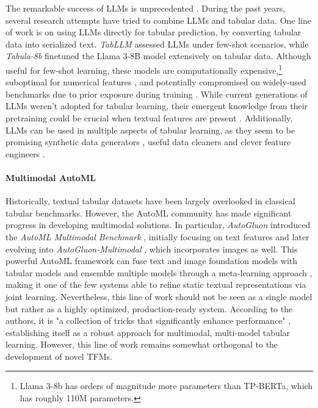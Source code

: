 \documentclass{article}
\begin{document}
The remarkable success of LLMs is unprecedented \cite{brown_language_2020, openai_gpt-4_2024}. During the past years, several research attempts have tried to combine LLMs and tabular data. One line of work is on using LLMs directly for tabular prediction, by converting tabular data into serialized text. \textit{TabLLM} \cite{hegselmann_tabllm_2023} assessed LLMs under few-shot scenarios, while \textit{Tabula-8b} \cite{gardner_large_2024} finetuned the Llama 3-8B model extensively on tabular data. Although useful for few-shot learning, these models are computationally expensive,\footnote{Llama 3-8b has orders of magnitude more parameters than TP-BERTa, which has roughly 110M parameters.} suboptimal for numerical features \cite{thawani_representing_2021, van_breugel_position_2024}, and potentially compromised on widely-used benchmarks due to prior exposure during training \cite{bordt_elephants_2024}. While current generations of LLMs weren't adopted for tabular learning, their emergent knowledge from their pretraining could be crucial when textual features are present \cite{van_breugel_position_2024, fang_large_2024}. Additionally, LLMs can be used in multiple aspects of tabular learning, as they seem to be promising synthetic data generators \cite{borisov_language_2022, solatorio_realtabformer_2023}, useful data cleaners \cite{bendinelli_exploring_2025} and clever feature engineers \cite{hollmann_large_2023}. 

\paragraph{Multimodal AutoML} Historically, textual tabular datasets have been largely overlooked in classical tabular benchmarks. However, the AutoML \cite{he_automl_2021} community has made significant progress in developing multimodal solutions. In particular, \textit{AutoGluon} \cite{erickson_autogluon-tabular_2020} introduced the \textit{AutoML Multimodal Benchmark} \cite{shi_benchmarking_2021}, initially focusing on text features and later evolving into \textit{AutoGluon-Multimodal} \cite{tang_bag_2024, tang_autogluon-multimodal_2024}, which incorporates images as well. This powerful AutoML framework can fuse text and image foundation models with tabular models and ensemble multiple models through a meta-learning approach \cite{feurer_auto-sklearn_2022}, making it one of the few systems able to refine static textual representations via joint learning.
Nevertheless, this line of work should not be seen as a single model but rather as a highly optimized, production-ready system. According to the authors, it is "a collection of tricks that significantly enhance performance" \cite{tang_bag_2024}, establishing itself as a robust approach for multimodal, multi-model tabular learning. However, this line of work remains somewhat orthogonal to the development of novel TFMs.
\end{document}
